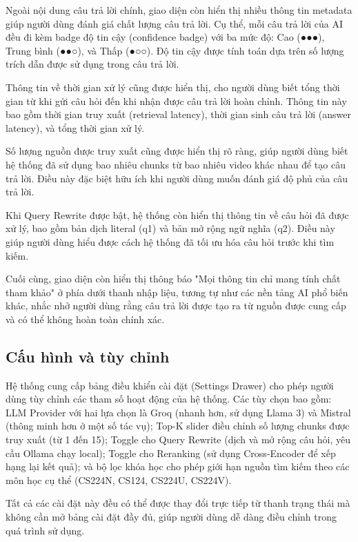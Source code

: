 Ngoài nội dung câu trả lời chính, giao diện còn hiển thị nhiều thông tin metadata giúp người dùng đánh giá chất lượng câu trả lời. Cụ thể, mỗi câu trả lời của AI đều đi kèm badge độ tin cậy (confidence badge) với ba mức độ: Cao (●●●), Trung bình (●●○), và Thấp (●○○). Độ tin cậy được tính toán dựa trên số lượng trích dẫn được sử dụng trong câu trả lời.

Thông tin về thời gian xử lý cũng được hiển thị, cho người dùng biết tổng thời gian từ khi gửi câu hỏi đến khi nhận được câu trả lời hoàn chỉnh. Thông tin này bao gồm thời gian truy xuất (retrieval latency), thời gian sinh câu trả lời (answer latency), và tổng thời gian xử lý.

Số lượng nguồn được truy xuất cũng được hiển thị rõ ràng, giúp người dùng biết hệ thống đã sử dụng bao nhiêu chunks từ bao nhiêu video khác nhau để tạo câu trả lời. Điều này đặc biệt hữu ích khi người dùng muốn đánh giá độ phủ của câu trả lời.

Khi Query Rewrite được bật, hệ thống còn hiển thị thông tin về câu hỏi đã được xử lý, bao gồm bản dịch literal (q1) và bản mở rộng ngữ nghĩa (q2). Điều này giúp người dùng hiểu được cách hệ thống đã tối ưu hóa câu hỏi trước khi tìm kiếm.

Cuối cùng, giao diện còn hiển thị thông báo "Mọi thông tin chỉ mang tính chất tham khảo" ở phía dưới thanh nhập liệu, tương tự như các nền tảng AI phổ biến khác, nhắc nhở người dùng rằng câu trả lời được tạo ra từ nguồn được cung cấp và có thể không hoàn toàn chính xác.

\subsection{Cấu hình và tùy chỉnh}

Hệ thống cung cấp bảng điều khiển cài đặt (Settings Drawer) cho phép người dùng tùy chỉnh các tham số hoạt động của hệ thống. Các tùy chọn bao gồm: LLM Provider với hai lựa chọn là Groq (nhanh hơn, sử dụng Llama 3) và Mistral (thông minh hơn ở một số tác vụ); Top-K slider điều chỉnh số lượng chunks được truy xuất (từ 1 đến 15); Toggle cho Query Rewrite (dịch và mở rộng câu hỏi, yêu cầu Ollama chạy local); Toggle cho Reranking (sử dụng Cross-Encoder để xếp hạng lại kết quả); và bộ lọc khóa học cho phép giới hạn nguồn tìm kiếm theo các môn học cụ thể (CS224N, CS124, CS224U, CS224V).

Tất cả các cài đặt này đều có thể được thay đổi trực tiếp từ thanh trạng thái mà không cần mở bảng cài đặt đầy đủ, giúp người dùng dễ dàng điều chỉnh trong quá trình sử dụng.

